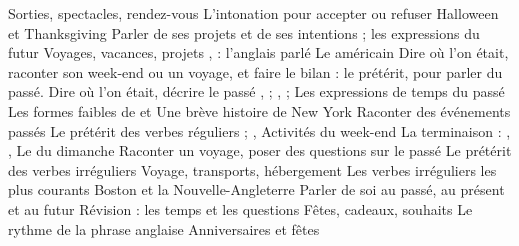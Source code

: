   {Sorties, spectacles, rendez-vous}
  {L'intonation pour accepter ou refuser}
  {Halloween et Thanksgiving}
  {Parler de ses projets et de ses intentions}
  { ; les expressions du futur}
  {Voyages, vacances, projets}
  {,  : l'anglais parlé}
  {Le  américain}
  {Dire où l'on était, raconter son week-end ou un voyage, et faire le bilan :
   le prétérit, pour parler du passé.}
  {Dire où l'on était, décrire le passé}
  {,  ; ,  ; }
  {Les expressions de temps du passé}
  {Les formes faibles de  et }
  {Une brève histoire de New York}
  {Raconter des événements passés}
  {Le prétérit des verbes réguliers ; , }
  {Activités du week-end}
  {La terminaison  : , , }
  {Le  du dimanche}
  {Raconter un voyage, poser des questions sur le passé}
  {Le prétérit des verbes irréguliers}
  {Voyage, transports, hébergement}
  {Les verbes irréguliers les plus courants}
  {Boston et la Nouvelle-Angleterre}
  {Parler de soi au passé, au présent et au futur}
  {Révision : les temps et les questions}
  {Fêtes, cadeaux, souhaits}
  {Le rythme de la phrase anglaise}
  {Anniversaires et fêtes}
